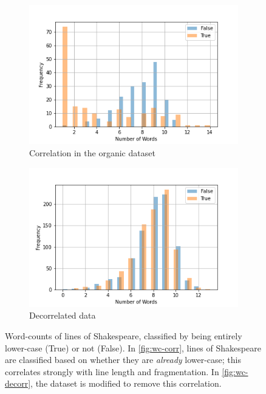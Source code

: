 \documentclass[a4paper, 11pt]{article}
\begin{document}
\begin{figure}
\centering
\begin{subfigure}{0.49\textwidth}
    \includegraphics[width=\textwidth]{images/word-count-correlating-with-lowercase-class.png}
    \caption{Correlation in the organic dataset}
    \label{fig:wc-corr}
\end{subfigure}
\hfill
\begin{subfigure}{0.49\textwidth}
    \includegraphics[width=\textwidth]{images/word-count-decorrelated-from-lowercase-class.png}
    \caption{Decorrelated data}
    \label{fig:wc-decorr}
\end{subfigure}
\caption{
Word-counts of lines of Shakespeare, classified by being entirely lower-case (True) or not (False).
In \eqref{fig:wc-corr}, lines of Shakespeare are classified based on whether they are \emph{already} lower-case; this correlates strongly with line length and fragmentation.
In \eqref{fig:wc-decorr}, the dataset is modified to remove this correlation.
}
\end{figure}
\end{document}
